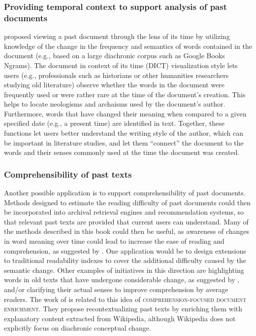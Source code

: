 \documentclass[output=paper%
]{langsci/langscibook}
\begin{document}
\subsubsection{Providing temporal context to support analysis of past documents} \citet{10.1145/3357384.3357844} proposed viewing a past document through the lens of its time by utilizing knowledge of the change in the frequency and semantics of words contained in the document (e.g., based on a large diachronic corpus such as Google Books Ngrams). The document in context of its time (DICT) visualization style lets users (e.g., professionals such as historians or other humanities researchers studying old literature) observe whether the words in the document were frequently used or were rather rare at the time of the document's creation. This helps to locate neologisms and archaisms used by the document's author. Furthermore, words that have changed their meaning when compared to a given specified date (e.g., a present time) are identified in text. Together, these functions let users better understand the writing style of the author, which can be important in literature studies, and let them ``connect'' the document to the words and their senses commonly used at the time the document was created.

\subsubsection{Comprehensibility of past texts} 
Another possible application is to support comprehensibility  of past documents. Methods designed to estimate the reading difficulty of past documents could then be  incorporated into archival retrieval engines and recommendation systems, so that relevant past texts are provided that current users can understand. 
Many of the methods described in this book could then be useful, as awareness of changes in word meaning over time could lead to increase the ease of reading and comprehension, as suggested by \citet{tahmasebi2013role}. One application would be to design extensions to traditional readability indexes to cover the additional difficulty caused by the semantic change. Other examples of initiatives in this direction are highlighting words in old texts that have undergone considerable change, as suggested by \citet{10.1145/3357384.3357844}, and/or clarifying their actual senses to improve comprehension by average readers. The work of \citet{tran:2015:bps:2684822.2685315} is related to this idea of \textsc{comprehension-focused document enrichment}. They propose recontextualizing past texts by enriching them with explanatory content extracted from Wikipedia, although Wikipedia does not explicitly focus on diachronic conceptual change.
\end{document}
